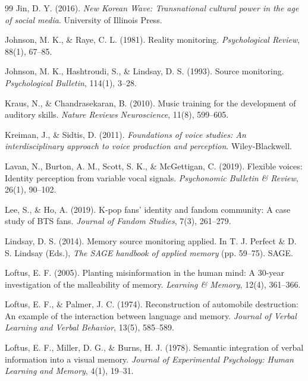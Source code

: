 \documentclass[12pt, a4paper]{article}
\begin{document}
\begin{thebibliography}{99}
Jin, D. Y. (2016). \textit{New Korean Wave: Transnational cultural power in the age of social media}. University of Illinois Press.

Johnson, M. K., \& Raye, C. L. (1981). Reality monitoring. \textit{Psychological Review}, 88(1), 67--85.

Johnson, M. K., Hashtroudi, S., \& Lindsay, D. S. (1993). Source monitoring. \textit{Psychological Bulletin}, 114(1), 3--28.

Kraus, N., \& Chandrasekaran, B. (2010). Music training for the development of auditory skills. \textit{Nature Reviews Neuroscience}, 11(8), 599--605.

Kreiman, J., \& Sidtis, D. (2011). \textit{Foundations of voice studies: An interdisciplinary approach to voice production and perception}. Wiley-Blackwell.

Lavan, N., Burton, A. M., Scott, S. K., \& McGettigan, C. (2019). Flexible voices: Identity perception from variable vocal signals. \textit{Psychonomic Bulletin \& Review}, 26(1), 90--102.

Lee, S., \& Ho, A. (2019). K-pop fans' identity and fandom community: A case study of BTS fans. \textit{Journal of Fandom Studies}, 7(3), 261--279.

Lindsay, D. S. (2014). Memory source monitoring applied. In T. J. Perfect \& D. S. Lindsay (Eds.), \textit{The SAGE handbook of applied memory} (pp. 59--75). SAGE.

Loftus, E. F. (2005). Planting misinformation in the human mind: A 30-year investigation of the malleability of memory. \textit{Learning \& Memory}, 12(4), 361--366.

Loftus, E. F., \& Palmer, J. C. (1974). Reconstruction of automobile destruction: An example of the interaction between language and memory. \textit{Journal of Verbal Learning and Verbal Behavior}, 13(5), 585--589.

Loftus, E. F., Miller, D. G., \& Burns, H. J. (1978). Semantic integration of verbal information into a visual memory. \textit{Journal of Experimental Psychology: Human Learning and Memory}, 4(1), 19--31.


\end{thebibliography}
\end{document}
